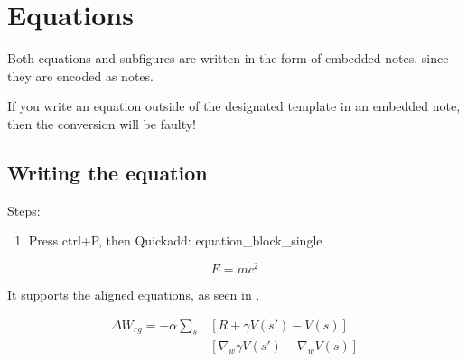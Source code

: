 \documentclass{extarticle}
\begin{document}
\section{Equations}

Both equations and subfigures are written in the form of embedded notes, since they are encoded as notes.

\begin{tcolorbox}[width=1.0\textwidth,colback={red},title={warning},outer arc=0mm,colupper=white]

If you write an equation outside of the designated template in an embedded note, then the conversion will be faulty!

\end{tcolorbox}

\subsection{Writing the equation}



Steps:



\begin{enumerate}

\item Press ctrl+P, then Quickadd: equation\_block\_single

\end{enumerate}




\begin{equation} \label{eq:Einstein}
	E=mc^{2}
\end{equation}





It supports the aligned equations, as seen in .




\begin{equation}\label{eq:1}
\begin{aligned}
\Delta W_{rg} = -\alpha \sum_{s}&[R+\gamma V(s')-V(s)]  \\
&[\nabla_{w} \gamma V(s')-\nabla_{w}V(s)]
\end{aligned}
\end{equation}

\end{document}
